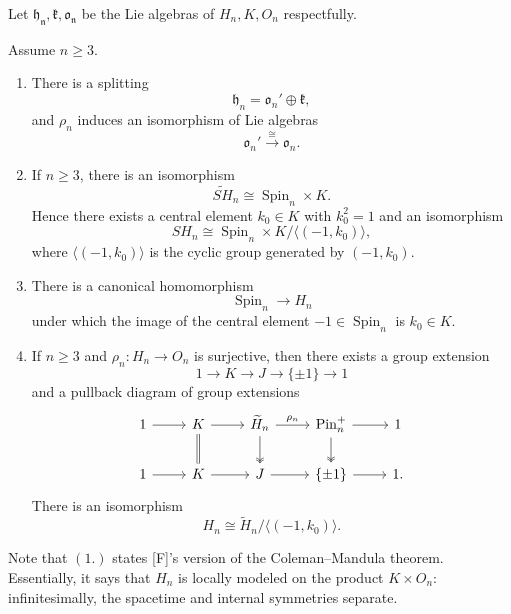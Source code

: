\documentclass[a4paper,11pt]{article}
\begin{document}
Let $\mathfrak{h_n}, \mathfrak{k}, \mathfrak{o_n}$ be the Lie algebras of $H_n, K, O_n$ respectfully.

\begin{theorem}[Theorem 3.16]
Assume $n \geq 3$.

\begin{enumerate}
    \item There is a splitting
    \[
        \mathfrak{h}_n = \mathfrak{o}_n' \oplus \mathfrak{k},
    \]
    and $\rho_n$ induces an isomorphism of Lie algebras
    \[
        \mathfrak{o}_n' \xrightarrow{\cong} \mathfrak{o}_n.
    \]

    \item If $n \geq 3$, there is an isomorphism
    \[
        \widetilde{SH}_n \cong \operatorname{Spin}_n \times K.
    \]
    Hence there exists a central element $k_0 \in K$ with $k_0^2 = 1$ and an isomorphism
    \[
        SH_n
        \cong
        \operatorname{Spin}_n \times K
        \big/
        \langle (-1,k_0)\rangle,
    \]
    where $\langle (-1,k_0)\rangle$ is the cyclic group generated by
    $(-1,k_0)$.

    \item There is a canonical homomorphism
    \[
        \operatorname{Spin}_n \longrightarrow H_n
    \]
    under which the image of the central element
    $-1 \in \operatorname{Spin}_n$
    is $k_0 \in K$.

    \item If $n \geq 3$ and $\rho_n : H_n \longrightarrow O_n$ is surjective, then there exists a group extension
    \[
        1 \longrightarrow K \longrightarrow J
        \longrightarrow \{\pm 1\} \longrightarrow 1
    \]
    and a pullback diagram of group extensions
    \[
    \begin{tikzcd}
        1 \arrow[r] &
        K \arrow[r] \arrow[d, equal] &
        \widetilde{H}_n \arrow[r, "\rho_n"] \arrow[d, two heads] &
        \operatorname{Pin}_n^+ \arrow[r] \arrow[d, two heads] &
        1 \\
        1 \arrow[r] &
        K \arrow[r] &
        J \arrow[r] &
        \{\pm1\} \arrow[r] &
        1.
    \end{tikzcd}
    \]
    There is an isomorphism
    \[
        H_n
        \cong
        \widetilde{H}_n
        \big/
        \langle (-1,k_0)\rangle.
    \]
\end{enumerate}
\end{theorem}

Note that $(1.)$ states [F]'s version of the Coleman--Mandula theorem.  Essentially, it says that $H_n$ is locally modeled on the product $K\times O_n$: infinitesimally, the spacetime and internal symmetries separate.\\
\end{document}
